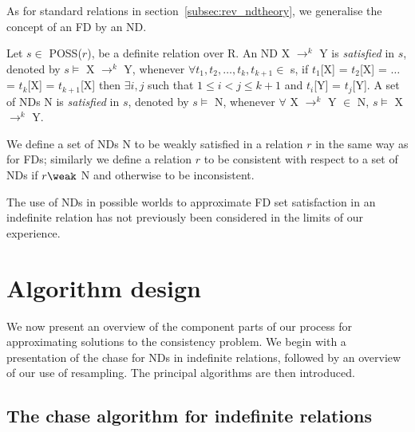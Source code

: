 As for standard relations in section~\ref{subsec:rev_ndtheory}, we
generalise the concept of an FD by an ND. 
 
\begin{definition}\label{def:sat-nd-indef}
\begin{rm}
Let $s \in$ POSS($r$), be a definite relation over R.
An ND X $\to^k$ Y is {\em satisfied} in $s$,
denoted by $s \models$ X $\to^k$ Y, whenever
$\forall t_1, t_2, \ldots, t_k, t_{k+1} \in$ s, if 
$t_1$[X] = $t_2$[X] = $\ldots$ = $t_k$[X] = $t_{k+1}$[X] then 
$\exists i,j$ such that $1 \le i < j \le k+1$
and $t_i$[Y] = $t_j$[Y].
A set of NDs N is {\em satisfied} in $s$,
denoted by $s \models$ N, whenever
$\forall$ X $\to^k$ Y $\in$ N, $s \models$ X $\to^k$ Y.

We define a set of NDs N to be weakly satisfied in a relation $r$
in the same way as for FDs; similarly we define 
a relation $r$ to be consistent with respect to a set of NDs if
$r \weak$ N and otherwise to be inconsistent.
\end{rm}
\end{definition}

\smallskip

The use of NDs in possible worlds to approximate FD set satisfaction
in an indefinite relation has not previously been considered in the
limits of our experience.

\section{Algorithm design}\label{sec:algdes}

We now present an overview of the component parts of our process for
approximating solutions to the consistency problem. We begin with a
presentation of the chase for NDs in indefinite relations, followed by
an overview of our use of resampling.  The principal algorithms are
then introduced.

\subsection{The chase algorithm for indefinite
relations}\label{subsec:cp_ndchase}

